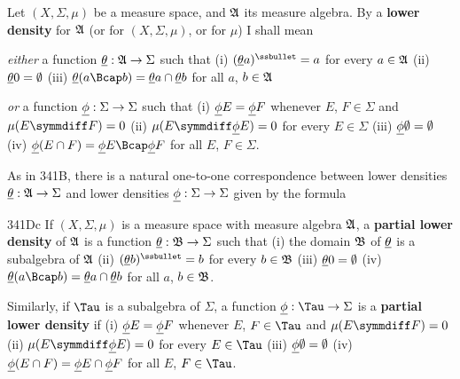 Let $(X,\Sigma,\mu)$ be a measure space,
and $\frak A$ its measure algebra.   By a {\bf lower density} for
$\frak A$ (or for $(X,\Sigma,\mu)$, or for $\mu$) I shall mean

{\it either} a function $\underline{\theta}:\frak A\to\Sigma$ such that
(i) $(\undtheta a)^{\ssbullet}=a$ for every $a\in\frak A$
(ii) $\underline{\theta}0=\emptyset$
(iii) $\undtheta(a\Bcap b)=\undtheta a\cap\undtheta b$ for all $a$,
$b\in\frak A$

{\it or} a function ${\underline{\phi}}:\Sigma\to\Sigma$ such that (i)
${\underline{\phi}} E={\underline{\phi}} F$ whenever $E$, $F\in\Sigma$ and
$\mu(E\symmdiff F)=0$ (ii) $\mu(E\symmdiff\undphi E)=0$
for every $E\in\Sigma$ (iii) ${\underline{\phi}}\emptyset=\emptyset$ (iv)
$\undphi(E\cap F)=\undphi E\Bcap\undphi F$ for all $E$, $F\in\Sigma$.

 As in 341B, there is a natural one-to-one
correspondence between lower densities
$\underline{\theta}:\frak A\to\Sigma$ and lower densities
${\underline{\phi}}:\Sigma\to\Sigma$ given by the formula




\spheader 341Dc
If $(X,\Sigma,\mu)$ is a measure space with measure algebra $\frak A$,
a {\bf partial lower density} of $\frak A$ is a function
$\underline{\theta}:\frak B\to\Sigma$ such that (i) the domain $\frak B$
of $\underline{\theta}$ is a subalgebra of $\frak A$ (ii)
$(\undtheta b)^{\ssbullet}=b$ for every $b\in\frak B$ (iii)
$\underline{\theta}0=\emptyset$ (iv)
$\undtheta(a\Bcap b)=\undtheta a\cap\undtheta b$ for all $a$,
$b\in\frak B$.

Similarly, if $\Tau$ is a subalgebra of $\Sigma$, a function
$\undphi:\Tau\to\Sigma$ is a {\bf partial lower density} if (i) ${\underline{\phi}}
E={\underline{\phi}} F$ whenever $E$, $F\in\Tau$ and $\mu(E\symmdiff F)=0$ (ii)
$\mu(E\symmdiff\undphi E)=0$ for every $E\in\Tau$ (iii)
${\underline{\phi}}\emptyset=\emptyset$
(iv) ${\underline{\phi}}(E\cap F)={\underline{\phi}} E\cap{\underline{\phi}} F$ for all $E$, $F\in\Tau$.

